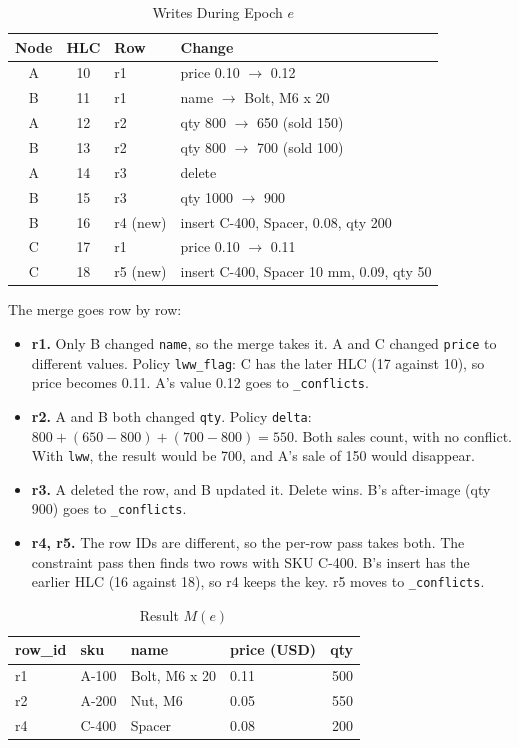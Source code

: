 \documentclass[journal]{IEEEtran}
\newcommand{\code}[1]{\texttt{#1}}
\begin{document}
\begin{table}[t]
\caption{Writes During Epoch $e$}\label{tab:writes}
\centering\small
\begin{tabular}{@{}cc l L{4.6cm}@{}}
\toprule
Node & HLC & Row & Change\\
\midrule
A & 10 & r1 & price 0.10 $\to$ 0.12\\
B & 11 & r1 & name $\to$ Bolt, M6 x 20\\
A & 12 & r2 & qty 800 $\to$ 650 (sold 150)\\
B & 13 & r2 & qty 800 $\to$ 700 (sold 100)\\
A & 14 & r3 & delete\\
B & 15 & r3 & qty 1000 $\to$ 900\\
B & 16 & r4 (new) & insert C-400, Spacer, 0.08, qty 200\\
C & 17 & r1 & price 0.10 $\to$ 0.11\\
C & 18 & r5 (new) & insert C-400, Spacer 10 mm, 0.09, qty 50\\
\bottomrule
\end{tabular}
\end{table}

The merge goes row by row:
\begin{itemize}
\item \textbf{r1.} Only B changed \code{name}, so the merge takes it. A and C changed \code{price} to different values. Policy \code{lww\_flag}: C has the later HLC (17 against 10), so price becomes 0.11. A's value 0.12 goes to \code{\_conflicts}.
\item \textbf{r2.} A and B both changed \code{qty}. Policy \code{delta}: $800+(650-800)+(700-800)=550$. Both sales count, with no conflict. With \code{lww}, the result would be 700, and A's sale of 150 would disappear.
\item \textbf{r3.} A deleted the row, and B updated it. Delete wins. B's after-image (qty 900) goes to \code{\_conflicts}.
\item \textbf{r4, r5.} The row IDs are different, so the per-row pass takes both. The constraint pass then finds two rows with SKU C-400. B's insert has the earlier HLC (16 against 18), so r4 keeps the key. r5 moves to \code{\_conflicts}.
\end{itemize}

\begin{table}[t]
\caption{Result $M(e)$}\label{tab:result}
\centering\small
\begin{tabular}{@{}llllr@{}}
\toprule
row\_id & sku & name & price (USD) & qty\\
\midrule
r1 & A-100 & Bolt, M6 x 20 & 0.11 & 500\\
r2 & A-200 & Nut, M6 & 0.05 & 550\\
r4 & C-400 & Spacer & 0.08 & 200\\
\bottomrule
\end{tabular}
\end{table}
\end{document}
